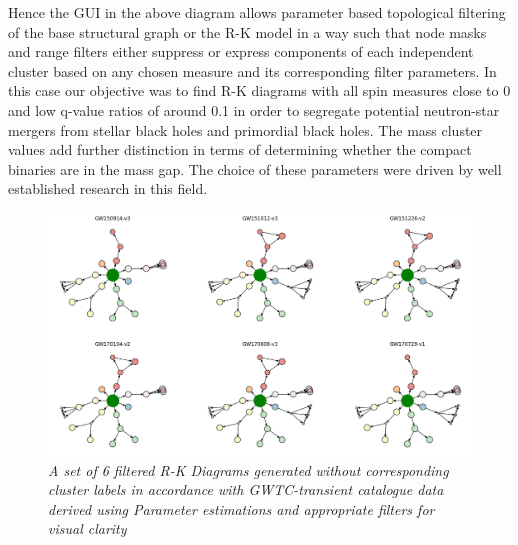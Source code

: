 Hence the GUI in the above diagram allows parameter based topological filtering of the base structural graph or the R-K model in a way such that node masks and range filters either suppress or express components of each independent cluster based on any chosen measure and its corresponding filter parameters. In this case our objective was to find R-K diagrams with all spin measures close to 0 and low q-value ratios of around 0.1 in order to segregate potential neutron-star mergers from stellar black holes and primordial black holes. The mass cluster values add further distinction in terms of determining whether the compact binaries are in the mass gap. The choice of these parameters were driven by well established research in this field. \cite{00.7_LIGOBayesianAnalysis} \cite{00.6_LIGOAnalysisPipeline} \cite{24.5_GWParameterEsitmation} \cite{24.7_qvalueestimation} \cite{24.8_PBHdetectionparameters} \cite{24.9_EffectiveSpin}

\begin{figure}[t]
    \centering
        \includegraphics[width=1.0\linewidth]{images/Filtered CBC R-K Diagrams without labels.png}
        \caption{\textit{A set of 6 filtered R-K Diagrams generated without corresponding cluster labels in accordance with GWTC-transient catalogue data derived using Parameter estimations and appropriate filters for visual clarity }}
    \label{fig:CBC_RKD_without_Labels}
\end{figure}
    

